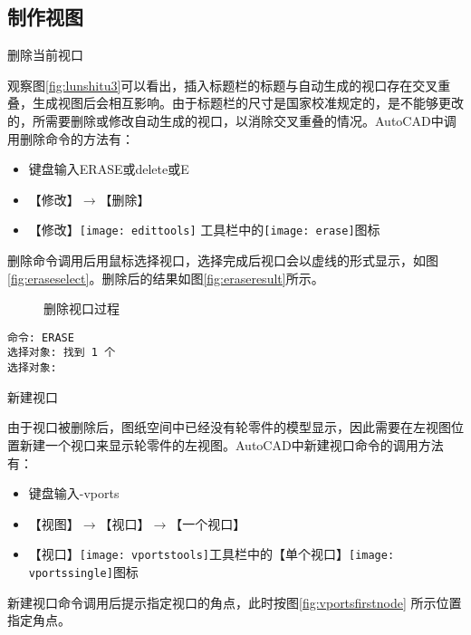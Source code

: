 \subsection{制作视图}
\begin{procedure}
\item 删除当前视口

观察图\ref{fig:lunshitu3}可以看出，插入标题栏的标题与自动生成的视口存在交叉重叠，生成视图后会相互影响。由于标题栏的尺寸是国家校准规定的，是不能够更改的，所需要删除或修改自动生成的视口，以消除交叉重叠的情况。AutoCAD中调用删除命令的方法有：
\begin{itemize}
\item 键盘输入ERASE或delete或E
\item 【修改】$\rightarrow $【删除】
\item 【修改】\texttt{[image: edittools]} 工具栏中的\texttt{[image: erase]}图标
\end{itemize}

删除命令调用后用鼠标选择视口，选择完成后视口会以虚线的形式显示，如图\ref{fig:eraseselect}。删除后的结果如图\ref{fig:eraseresult}所示。

\begin{figure}[htbp]
\centering
{}\hspace{20pt}
\caption{删除视口过程}
\end{figure}
\begin{lstlisting}
命令: ERASE
选择对象: 找到 1 个
选择对象:
\end{lstlisting}

\item 新建视口

由于视口被删除后，图纸空间中已经没有轮零件的模型显示，因此需要在左视图位置新建一个视口来显示轮零件的左视图。AutoCAD中新建视口命令的调用方法有：
\begin{itemize}
\item 键盘输入-vports
\item 【视图】$\rightarrow $【视口】$\rightarrow $【一个视口】
\item 【视口】\texttt{[image: vportstools]}工具栏中的【单个视口】\texttt{[image: vportssingle]}图标
\end{itemize}

新建视口命令调用后提示指定视口的角点，此时按图\ref{fig:vportsfirstnode} 所示位置指定角点。


\end{procedure}
